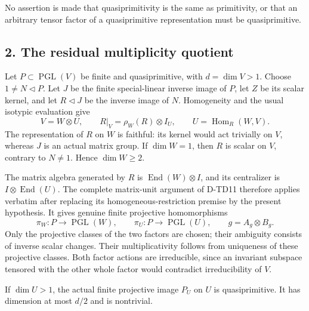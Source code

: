 No assertion is made that quasiprimitivity is the same as
primitivity, or that an arbitrary tensor factor of a quasiprimitive
representation must be quasiprimitive.

\subsection*{2. The residual multiplicity quotient}

Let \(P\subset\operatorname{PGL}(V)\) be finite and
quasiprimitive, with \(d=\dim V>1\). Choose
\(1\ne N\triangleleft P\). Let \(J\) be the finite special-linear
inverse image of \(P\), let \(Z\) be its scalar kernel, and let
\(R\triangleleft J\) be the inverse image of \(N\).
Homogeneity and the usual isotypic evaluation give
\[
 V=W\otimes U,\qquad
 R|_V=\rho_W(R)\otimes I_U,\qquad
 U=\operatorname{Hom}_R(W,V).
 \tag{QPX.1}
\]
The representation of \(R\) on \(W\) is faithful: its kernel
would act trivially on \(V\), whereas \(J\) is an actual matrix
group. If \(\dim W=1\), then \(R\) is scalar on \(V\), contrary
to \(N\ne1\). Hence \(\dim W\ge2\).

The matrix algebra generated by \(R\) is
\(\operatorname{End}(W)\otimes I\), and its centralizer is
\(I\otimes\operatorname{End}(U)\). The complete matrix-unit
argument of D-TD11 therefore applies verbatim after replacing
its homogeneous-restriction premise by the present hypothesis.
It gives genuine finite projective homomorphisms
\[
 \pi_W:P\longrightarrow\operatorname{PGL}(W),\qquad
 \pi_U:P\longrightarrow\operatorname{PGL}(U),\qquad
 g=A_g\otimes B_g.
 \tag{QPX.2}
\]
Only the projective classes of the two factors are chosen;
their ambiguity consists of inverse scalar changes. Their
multiplicativity follows from uniqueness of these projective
classes. Both factor actions are irreducible, since an invariant
subspace tensored with the other whole factor would contradict
irreducibility of \(V\).

\begin{lemma}
If \(\dim U>1\), the actual finite projective image \(P_U\)
on \(U\) is quasiprimitive. It has dimension at most \(d/2\)
and is nontrivial.
\end{lemma}


